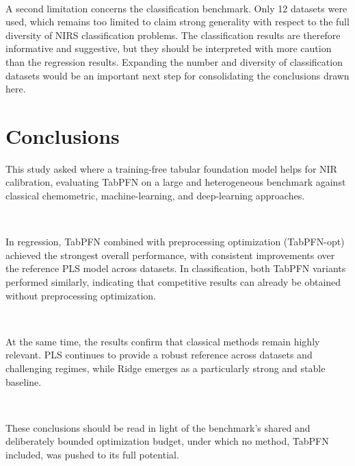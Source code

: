 \documentclass{article}
\begin{document}
~

A second limitation concerns the classification benchmark. Only 12 datasets were used, which remains too limited to claim strong generality with respect to the full diversity of NIRS classification problems. The classification results are therefore informative and suggestive, but they should be interpreted with more caution than the regression results. Expanding the number and diversity of classification datasets would be an important next step for consolidating the conclusions drawn here.



\section{Conclusions}

This study asked where a training-free tabular foundation model helps for NIR calibration, evaluating TabPFN on a large and heterogeneous benchmark against classical chemometric, machine-learning, and deep-learning approaches.

~

In regression, TabPFN combined with preprocessing optimization (TabPFN-opt) achieved the strongest overall performance, with consistent improvements over the reference PLS model across datasets. In classification, both TabPFN variants performed similarly, indicating that competitive results can already be obtained without preprocessing optimization.

~

At the same time, the results confirm that classical methods remain highly relevant. PLS continues to provide a robust reference across datasets and challenging regimes, while Ridge emerges as a particularly strong and stable baseline.

~

These conclusions should be read in light of the benchmark's shared and deliberately bounded optimization budget, under which no method, TabPFN included, was pushed to its full potential.
\end{document}
